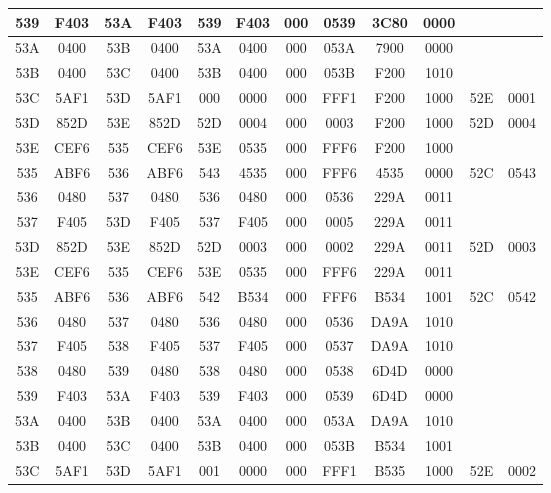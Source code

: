 \begin{center}
\begin{tabular}{|c|c|c|c|c|c|c|c|c|c|c|c|}
        \hline
        539	& F403	& 53A	& F403	& 539	& F403	& 000	& 0539	& 3C80	& 0000 & & \\
        \hline
        53A	& 0400	& 53B	& 0400	& 53A	& 0400	& 000	& 053A	& 7900	& 0000 & & \\
        \hline
        53B	& 0400	& 53C	& 0400	& 53B	& 0400	& 000	& 053B	& F200	& 1010 & & \\
        \hline
        53C	& 5AF1	& 53D	& 5AF1	& 000	& 0000	& 000	& FFF1	& F200	& 1000	& 52E	& 0001 \\
        \hline
        53D	& 852D	& 53E	& 852D	& 52D	& 0004	& 000	& 0003	& F200	& 1000	& 52D	& 0004 \\
        \hline
        53E	& CEF6	& 535	& CEF6	& 53E	& 0535	& 000	& FFF6	& F200	& 1000 & & \\
        \hline
        535	& ABF6	& 536	& ABF6	& 543	& 4535	& 000	& FFF6	& 4535	& 0000	& 52C	& 0543 \\
        \hline
        536	& 0480	& 537	& 0480	& 536	& 0480	& 000	& 0536	& 229A	& 0011 & & \\
        \hline
        537	& F405	& 53D	& F405	& 537	& F405	& 000	& 0005	& 229A	& 0011 & & \\
        \hline
        53D	& 852D	& 53E	& 852D	& 52D	& 0003	& 000	& 0002	& 229A	& 0011	& 52D	& 0003 \\
        \hline
        53E	& CEF6	& 535	& CEF6	& 53E	& 0535	& 000	& FFF6	& 229A	& 0011 & & \\
        \hline
        535	& ABF6	& 536	& ABF6	& 542	& B534	& 000	& FFF6	& B534	& 1001	& 52C	& 0542 \\
        \hline
        536	& 0480	& 537	& 0480	& 536	& 0480	& 000	& 0536	& DA9A	& 1010 & & \\
        \hline
        537	& F405	& 538	& F405	& 537	& F405	& 000	& 0537	& DA9A	& 1010 & & \\
        \hline
        538	& 0480	& 539	& 0480	& 538	& 0480	& 000	& 0538	& 6D4D	& 0000 & & \\
        \hline
        539	& F403	& 53A	& F403	& 539	& F403	& 000	& 0539	& 6D4D	& 0000 & & \\
        \hline
        53A	& 0400	& 53B	& 0400	& 53A	& 0400	& 000	& 053A	& DA9A	& 1010 & & \\
        \hline
        53B	& 0400	& 53C	& 0400	& 53B	& 0400	& 000	& 053B	& B534	& 1001 & & \\
        \hline
        53C	& 5AF1	& 53D	& 5AF1	& 001	& 0000	& 000	& FFF1	& B535	& 1000	& 52E	& 0002 \\

\end{tabular}
\end{center}
